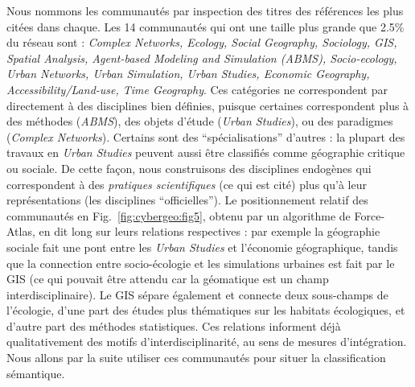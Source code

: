 {Nous nommons les communautés par inspection des titres des références les plus citées dans chaque. Les 14 communautés qui ont une taille plus grande que 2.5\% du réseau sont : \textit{Complex Networks, Ecology, Social Geography, Sociology, GIS, Spatial Analysis, Agent-based Modeling and Simulation (ABMS), Socio-ecology, Urban Networks, Urban Simulation, Urban Studies, Economic Geography, Accessibility/Land-use, Time Geography}. Ces catégories ne correspondent par directement à des disciplines bien définies, puisque certaines correspondent plus à des méthodes (\textit{ABMS}), des objets d'étude (\textit{Urban Studies}), ou des paradigmes (\textit{Complex Networks}). Certains sont des ``spécialisations'' d'autres : la plupart des travaux en \textit{Urban Studies} peuvent aussi être classifiés comme géographie critique ou sociale. De cette façon, nous construisons des disciplines endogènes qui correspondent à des \emph{pratiques scientifiques} (ce qui est cité) plus qu'à leur représentations (les disciplines ``officielles''). Le positionnement relatif des communautés en Fig.~\ref{fig:cybergeo:fig5}, obtenu par un algorithme de Force-Atlas, en dit long sur leurs relations respectives : par exemple la géographie sociale fait une pont entre les \textit{Urban Studies} et l'économie géographique, tandis que la connection entre socio-écologie et les simulations urbaines est fait par le GIS (ce qui pouvait être attendu car la géomatique est un champ interdisciplinaire). Le GIS sépare également et connecte deux sous-champs de l'écologie, d'une part des études plus thématiques sur les habitats écologiques, et d'autre part des méthodes statistiques. Ces relations informent déjà qualitativement des motifs d'interdisciplinarité, au sens de mesures d'intégration. Nous allons par la suite utiliser ces communautés pour situer la classification sémantique.
}







